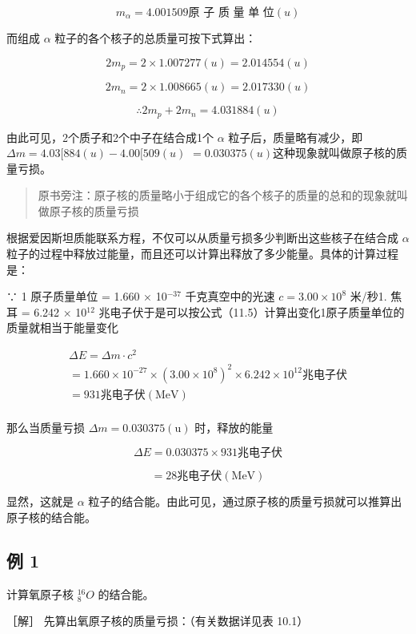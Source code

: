 \[
m _ {\alpha} = 4.001509 \text{原 子 质 量 单 位} (u)
\]

而组成 \(\alpha\) 粒子的各个核子的总质量可按下式算出：

\[
2 m _ {p} = 2 \times 1.007277 (u) = 2.014554 (u)
\]

\[
2 m _ {n} = 2 \times 1.008665 (u) = 2.017330 (u)
\]

\[
\therefore 2 m _ {p} + 2 m _ {n} = 4.031884 (u)
\]

由此可见，2个质子和2个中子在结合成1个 \(\alpha\)
粒子后，质量略有减少，即\(\Delta m = 4.03[884(u) - 4.00[509(u)\)
\(= 0.030375(u)\)这种现象就叫做原子核的质量亏损。

\begin{quote}
原书旁注：原子核的质量略小于组成它的各个核子的质量的总和的现象就叫做原子核的质量亏损
\end{quote}

根据爱因斯坦质能联系方程，不仅可以从质量亏损多少判断出这些核子在结合成
\(\alpha\)
粒子的过程中释放过能量，而且还可以计算出释放了多少能量。具体的计算过程是：

∵ 1 原子质量单位 = 1.660 × 10\(^{-37}\) 千克真空中的光速
\(c = 3.00 \times 10^{8}\) 米/秒1. 焦耳 = 6.242 × 10\(^{12}\)
兆电子伏于是可以按公式（11.5）计算出变化1原子质量单位的质量就相当于能量变化

\[
\begin{array}{l} \Delta E = \Delta m \cdot c ^ {2} \\ = 1.660 \times 10 ^ {- 27} \times (3.00 \times 10 ^ {8}) ^ {2} \times 6.242 \times 10 ^ {12} \text{兆电子伏} \\ = 931 \text{兆电子伏} (\mathrm{MeV}) \\ \end{array}
\]

那么当质量亏损 \(\Delta m = 0.030375(\mathrm{u})\) 时，释放的能量

\[
\Delta E = 0.030375 \times 931 \text{兆电子伏}
\]

\[
= 28 \text{兆电子伏} (\mathrm{MeV})
\]

显然，这就是 \(\alpha\)
粒子的结合能。由此可见，通过原子核的质量亏损就可以推算出原子核的结合能。

\subsection{例 1}

计算氧原子核 \({}^{16}_{8}O\) 的结合能。

［解］ 先算出氧原子核的质量亏损：（有关数据详见表 10.1）

